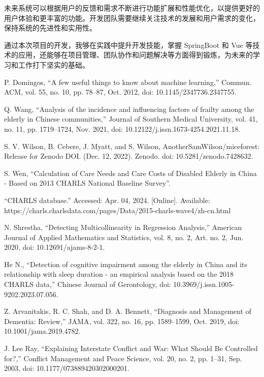 \documentclass{base}
\begin{document}
未来系统可以根据用户的反馈和需求不断进行功能扩展和性能优化，以提供更好的用户体验和更丰富的功能。开发团队需要继续关注技术的发展和用户需求的变化，保持系统的先进性和实用性。

通过本次项目的开发，我够在实践中提升开发技能，掌握 SpringBoot 和 Vue 等技术的应用，还能够在项目管理、团队协作和问题解决等方面得到锻炼，为未来的学习和工作打下坚实的基础。




\noindent[1] P. Domingos, “A few useful things to know about machine learning,” Commun. ACM, vol. 55, no. 10, pp. 78–87, Oct. 2012, doi: 10.1145/2347736.2347755.

\noindent[2] Q. Wang, “Analysis of the incidence and influencing factors of frailty among the elderly in Chinese communities,” Journal of Southern Medical University, vol. 41, no. 11, pp. 1719–1724, Nov. 2021, doi: 10.12122/j.issn.1673-4254.2021.11.18.

\noindent[3] S. V. Wilson, B. Cebere, J. Myatt, and S. Wilson, AnotherSamWilson/miceforest: Release for Zenodo DOI. (Dec. 12, 2022). Zenodo. doi: 10.5281/zenodo.7428632.

\noindent[4] S. Wen, “Calculation of Care Needs and Care Costs of Disabled Elderly in China - Based  on 2013 CHARLS National Baseline Survey”.

\noindent[5] “CHARLS database.” Accessed: Apr. 04, 2024. [Online]. Available: https://charls.charlsdata.com/pages/Data/2015-charls-wave4/zh-cn.html

\noindent[6] N. Shrestha, “Detecting Multicollinearity in Regression Analysis,” American Journal of Applied Mathematics and Statistics, vol. 8, no. 2, Art. no. 2, Jun. 2020, doi: 10.12691/ajams-8-2-1.

\noindent[7] He N., “Detection of cognitive impairment among the elderly in China and its relationship with sleep duration - an empirical analysis based on the 2018 CHARLS data,” Chinese Journal of Gerontology, doi: 10.3969/j.issn.1005-9202.2023.07.056.

\noindent[8] Z. Arvanitakis, R. C. Shah, and D. A. Bennett, “Diagnosis and Management of Dementia: Review,” JAMA, vol. 322, no. 16, pp. 1589–1599, Oct. 2019, doi: 10.1001/jama.2019.4782.

\noindent[9] J. Lee Ray, “Explaining Interstate Conflict and War: What Should Be Controlled for?,” Conflict Management and Peace Science, vol. 20, no. 2, pp. 1–31, Sep. 2003, doi: 10.1177/073889420302000201.
\end{document}
